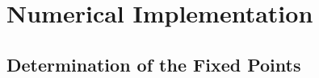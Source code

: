 \chapter{Numerical Implementation}
\blindtext

\section{Determination of the Fixed Points}
\blindtext